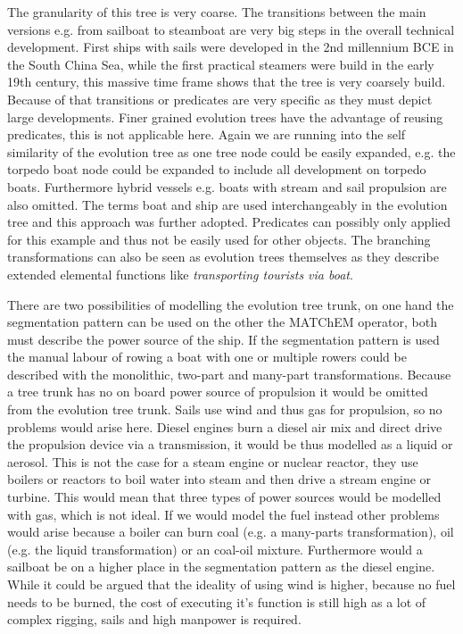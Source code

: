 \documentclass[11pt,a4paper]{article}
\begin{document}
The granularity of this tree is very coarse. The transitions between the main versions e.g. from sailboat to steamboat are very big steps in the overall technical development. First ships with sails were developed in the 2nd millennium BCE in the South China Sea, while the first practical steamers were build in the early 19th century, this massive time frame shows that the tree is very coarsely build. Because of that transitions or predicates are very specific as they must depict large developments. Finer grained evolution trees have the advantage of reusing predicates, this is not applicable here. Again we are running into the self similarity of the evolution tree as one tree node could be easily expanded, e.g. the torpedo boat node could be expanded to include all development on torpedo boats. Furthermore hybrid vessels e.g. boats with stream and sail propulsion are also omitted. The terms boat and ship are used interchangeably in the evolution tree and this approach was further adopted. Predicates can possibly only applied for this example and thus not be easily used for other objects. The branching transformations can also be seen as evolution trees themselves as they describe extended elemental functions like \textit{transporting tourists via boat}.

There are two possibilities of modelling the evolution tree trunk, on one hand the segmentation pattern can be used on the other the MATChEM operator, both must describe the power source of the ship. If the segmentation pattern is used the manual labour of rowing a boat with one or multiple rowers could be described with the monolithic, two-part and many-part transformations. Because a tree trunk has no on board power source of propulsion it would be omitted from the evolution tree trunk. Sails use wind and thus gas for propulsion, so no problems would arise here. Diesel engines burn a diesel air mix and direct drive the propulsion device via a transmission, it would be thus modelled as a liquid or aerosol. This is not the case for a steam engine or nuclear reactor, they use boilers or reactors to boil water into steam and then drive a stream engine or turbine. This would mean that three types of power sources would be modelled with gas, which is not ideal. If we would model the fuel instead other problems would arise because a boiler can burn coal (e.g. a many-parts transformation), oil (e.g. the liquid transformation) or an coal-oil mixture. Furthermore would a sailboat be on a higher place in the segmentation pattern as the diesel engine. While it could be argued that the ideality of using wind is higher, because no fuel needs to be burned, the cost of executing it's function is still high as a lot of complex rigging, sails and high manpower is required.
\end{document}
